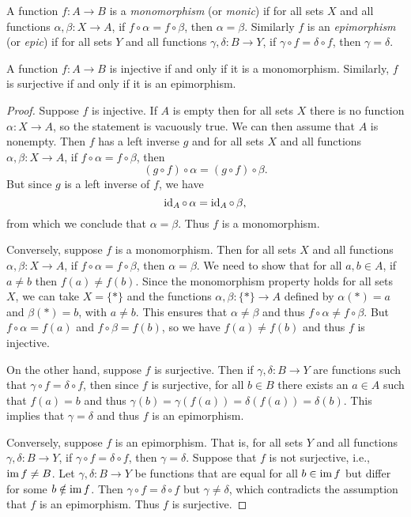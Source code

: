\begin{definition}
    A function \(f: A \to B\) is a \emph{monomorphism} (or \emph{monic}) if for
    all sets \(X\) and all functions \(\alpha, \beta: X \to A\), if \(f \circ
    \alpha = f \circ \beta\), then \(\alpha = \beta\). Similarly \(f\) is an
    \emph{epimorphism} (or \emph{epic}) if for all sets \(Y\) and all functions
    \(\gamma, \delta: B \to Y\), if \(\gamma \circ f = \delta \circ f\), then
    \(\gamma = \delta\).
\end{definition}

\begin{theorem}
    A function \(f: A \to B\) is injective if and only if it is a monomorphism.
    Similarly, \(f\) is surjective if and only if it is an epimorphism.
\end{theorem}

\begin{proof}
    Suppose \(f\) is injective. If \(A\) is empty then for all sets \(X\) there is no function \(\alpha: X \to A\), so the statement is vacuously true. We can then assume that \(A\) is nonempty. Then \(f\) has a left inverse \(g\) and for all sets \(X\) and all functions \(\alpha, \beta: X \to A\), if \(f \circ \alpha = f \circ \beta\),
    then 
    \[
        (g \circ f)\circ \alpha = (g \circ f) \circ \beta.
    \]
    But since \(g\) is a left inverse of \(f\), we have
    \[
        \operatorname{id}_A \circ\,\alpha = \operatorname{id}_A \circ\,\beta,
    \]
    from which we conclude that \(\alpha = \beta\). Thus \(f\) is a monomorphism. 
    
    Conversely, suppose \(f\) is a monomorphism. Then for all sets \(X\) and all functions \(\alpha, \beta: X \to A\), if \(f \circ \alpha = f \circ \beta\), then \(\alpha = \beta\). We need to show that for all \(a, b \in A\), if \(a \neq b\) then \(f(a) \neq f(b)\). Since the monomorphism property holds for all sets \(X\), we can take \(X = \{*\}\) and the functions \(\alpha, \beta: \{*\} \to A\) defined by \(\alpha(*) = a\) and \(\beta(*) = b\), with \(a \neq b\). This ensures that \(\alpha \neq \beta\) and thus \(f \circ \alpha \neq f \circ \beta\). But \(f \circ \alpha = f(a)\) and \(f \circ \beta = f(b)\), so we have \(f(a) \neq f(b)\) and thus \(f\) is injective.

    On the other hand, suppose \(f\) is surjective. Then if \(\gamma, \delta: B \to Y\) are functions such that \(\gamma \circ f = \delta \circ f\), then since \(f\) is surjective, for all \(b \in B\) there exists an \(a \in A\) such that \(f(a) = b\) and thus \(\gamma(b) = \gamma(f(a)) = \delta(f(a)) = \delta(b)\). This implies that \(\gamma = \delta\) and thus \(f\) is an epimorphism.

    Conversely, suppose \(f\) is an epimorphism. That is, for all sets \(Y\) and all functions \(\gamma, \delta: B \to Y\), if \(\gamma \circ f = \delta \circ f\), then \(\gamma = \delta\). Suppose that \(f\) is not surjective, i.e., \(\operatorname{im} f \neq B\). Let \(\gamma, \delta: B \to Y\) be functions that are equal for all \(b \in \operatorname{im} f\) but differ for some \(b \notin \operatorname{im} f\). Then \(\gamma \circ f = \delta \circ f\) but \(\gamma \neq \delta\), which contradicts the assumption that \(f\) is an epimorphism. Thus \(f\) is surjective.
\end{proof}

